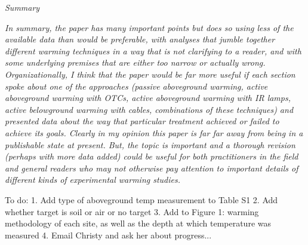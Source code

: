 \documentclass[11pt,a4paper]{letter}
\begin{document}
\begin{letter}{}
\emph{Summary}

\emph{In summary, the paper has many important points but does so using less of the available data
than would be preferable, with analyses that jumble together different warming techniques in a
way that is not clarifying to a reader, and with some underlying premises that are either too
narrow or actually wrong. Organizationally, I think that the paper would be far more useful if
each section spoke about one of the approaches (passive aboveground warming, active
aboveground warming with OTCs, active aboveground warming with IR lamps, active
belowground warming with cables, combinations of these techniques) and presented data
about the way that particular treatment achieved or failed to achieve its goals. Clearly in my
opinion this paper is far far away from being in a publishable state at present. But, the topic is
important and a thorough revision (perhaps with more data added) could be useful for both
practitioners in the field and general readers who may not otherwise pay attention to
important details of different kinds of experimental warming studies.}

To do:
1. Add type of aboveground temp measurement to Table S1
2. Add whether target is soil or air or no target
3. Add to Figure 1: warming methodology of each site, as well as the depth at which temperature was measured
4. Email Christy and ask her about progress...

\end{letter}
\end{document}
